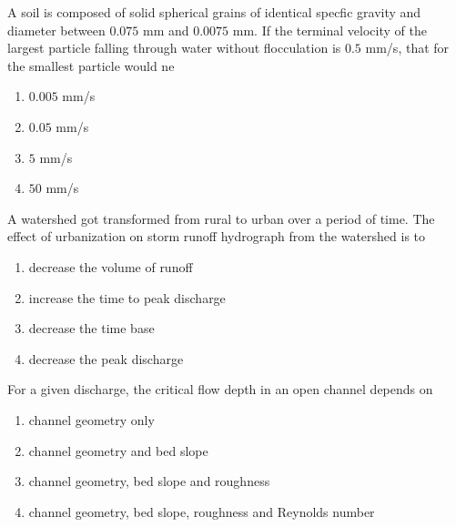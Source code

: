 \iffalse
\chapter{2011}
\author{EE24BTECH11002}
\section{ce}
\fi
    \item A soil is composed of solid spherical grains of identical specfic gravity and diameter between $0.075$ mm and $0.0075$ mm. If the terminal velocity of the largest particle falling through water without flocculation is $0.5$ mm/s, that for the smallest particle would ne
	\hfill{}

	\begin{enumerate}
		\item $0.005$ mm/s
		\item $0.05$ mm/s
		\item $5$ mm/s
		\item $50$ mm/s
	\end{enumerate}

    \item A watershed got transformed from rural to urban over a period of time. The effect of urbanization on storm runoff hydrograph from the watershed is to
	\hfill{}

	\begin{enumerate}
		\item decrease the volume of runoff
		\item increase the time to peak discharge
		\item decrease the time base
		\item decrease the peak discharge
	\end{enumerate}

    \item For a given discharge, the critical flow depth in an open channel depends on
	\hfill{}

	\begin{enumerate}
		\item channel geometry only
		\item channel geometry and bed slope
		\item channel geometry, bed slope and roughness
		\item channel geometry, bed slope, roughness and Reynolds number
	\end{enumerate}


